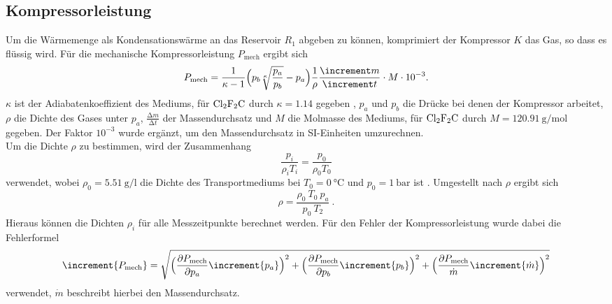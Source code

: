 \subsection{Kompressorleistung}
Um die Wärmemenge als Kondensationswärme an das Reservoir $R_1$ abgeben zu können, komprimiert der Kompressor $K$ das Gas, so dass es flüssig wird.
Für die mechanische Kompressorleistung $P_{\text{mech}}$ ergibt sich
\begin{equation}
  P_{\text{mech}} = \frac{1}{\kappa -1}\Bigl(p_b \sqrt[\kappa]{\frac{p_a}{p_b}} - p_a \Bigr) \frac{1}{\rho} \frac{\increment m}{\increment t} \cdot M \cdot 10^{-3}.
\end{equation}
$\kappa$ ist der Adiabatenkoeffizient des Mediums, für $\ce{Cl2F2C}$ durch $\kappa = 1.14$ gegeben \cite{sample}, $p_a$ und $p_b$ die Drücke bei denen der Kompressor arbeitet, $\rho$ die Dichte des Gases unter $p_a$, $\frac{\increment m}{\increment t}$ der Massendurchsatz und $M$ die Molmasse des Mediums, für $\ce{Cl2F2C}$ durch $M = \SI{120.91}{\gram\per\mol}$ gegeben. Der Faktor $10^{-3}$ wurde ergänzt, um den Massendurchsatz in SI-Einheiten umzurechnen. \\
Um die Dichte $\rho$ zu bestimmen, wird der Zusammenhang
\begin{equation}
  \frac{p_i}{\rho_iT_i} = \frac{p_0}{\rho_0T_0}
\end{equation}
verwendet, wobei $\rho_0 = \SI{5,51}{\gram\per\litre}$ die Dichte des Transportmediums bei $T_0 = \SI{0}{\celsius}$ und $p_0 = \SI{1}{\bar}$ ist \cite{sample}.
Umgestellt nach $\rho$ ergibt sich
\begin{equation*}
  \rho = \frac{\rho_0 \ T_0 \ p_a}{p_0 \ T_2} \ .
\end{equation*}
Hieraus können die Dichten $\rho_i$ für alle Messzeitpunkte berechnet werden.
Für den Fehler der Kompressorleistung wurde dabei die Fehlerformel
\begin{equation}
  \increment{P_{\text{mech}}} = \sqrt{\Bigl(\frac{\partial P_{\text{mech}}}{\partial p_a}\increment{p_a}\Bigr)^2 + \Bigl( \frac{\partial P_{\text{mech}}}{\partial p_b}\increment{p_b}\Bigr)^2 + \Bigl( \frac{\partial P_{\text{mech}}}{\dot{m}} \increment{\dot{m}}  \Bigr)^2}
\end{equation}
verwendet, $\dot{m}$ beschreibt hierbei den Massendurchsatz.

